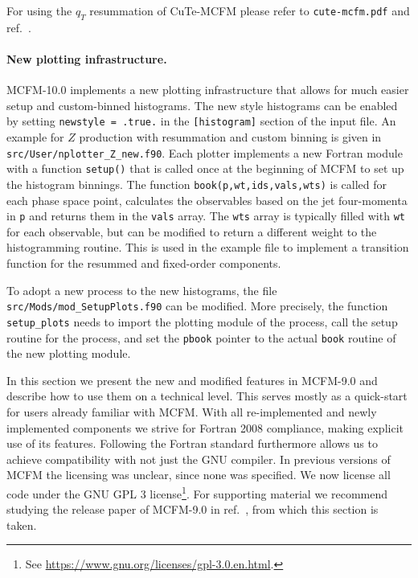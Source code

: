 \label{mcfm9plus}


For using the $q_T$ resummation of CuTe-MCFM please refer to \texttt{cute-mcfm.pdf}
and ref.~\cite{Becher:2020ugp}.

\paragraph{New plotting infrastructure.}
MCFM-10.0 implements a new plotting infrastructure that allows for much easier setup
and custom-binned histograms. The new style histograms can be enabled by setting \texttt{newstyle = 
.true.} in the \texttt{[histogram]} section of the input file. An example for $Z$ production with 
resummation and custom binning is given in \texttt{src/User/nplotter\_Z\_new.f90}. Each plotter
implements a new Fortran module with a function \texttt{setup()} that is called once at the 
beginning of MCFM to set up the histogram binnings. The function 
\texttt{book(p,wt,ids,vals,wts)} is called for each phase space point, calculates the observables 
based on the jet four-momenta in \texttt{p} and returns them in the \texttt{vals} array. The 
\texttt{wts} array is typically filled with \texttt{wt} for each observable, but can be modified to 
return a different weight to the histogramming routine. This is used in the example file to 
implement a transition function for the resummed and fixed-order components.

To adopt a new process to the new histograms, the file \texttt{src/Mods/mod\_SetupPlots.f90}
can be modified. More precisely, the function \texttt{setup\_plots} needs to import the plotting 
module of the process, call the setup routine for the process, and set the \texttt{pbook} pointer
to the actual \texttt{book} routine of the new plotting module.

\label{sec:newfeatures-app}

In this section we present the new and modified features in MCFM-9.0 and describe how to use them on a technical 
level. This serves mostly as a quick-start for users already familiar with MCFM. With all re-implemented and newly 
implemented components we strive for Fortran 2008 compliance, making explicit 
use of its features. Following the Fortran standard furthermore allows us to achieve compatibility with not just the 
GNU compiler. In previous versions of MCFM the licensing was unclear, since none was specified. We now license all 
code under the GNU GPL 3 license\footnote{See \url{https://www.gnu.org/licenses/gpl-3.0.en.html}.}. For supporting 
material we recommend studying the release paper of MCFM-9.0 in ref.~\cite{MCFM9}, from which this section is taken.

